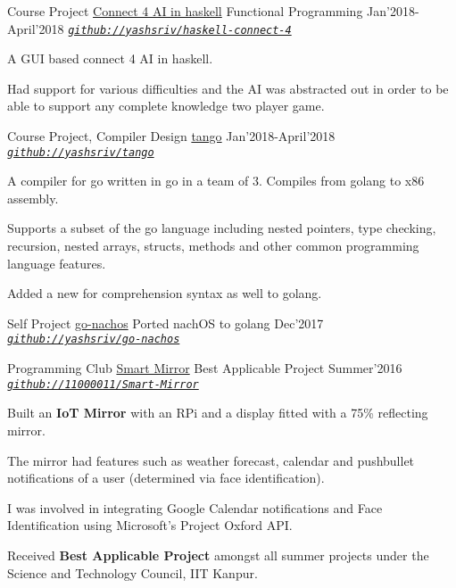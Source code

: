 \begin{cventries}
  \smallcventry
  {Course Project}
  {\href{https://github.com/yashsriv/haskell-connect-4}{Connect 4 AI in haskell}}
  {Functional Programming}
  {Jan'2018-April'2018}
  {\emph{\texttt{\href{https://github.com/yashsriv/haskell-connect-4}{github://yashsriv/haskell-connect-4}}}}
  {
    \begin{cvitems}
    \item A GUI based connect 4 AI in haskell.
    \item Had support for various difficulties and the AI was abstracted out in
      order to be able to support any complete knowledge two player game.
    \end{cvitems}
  }

  \smallcventry
  {Course Project, Compiler Design}
  {\href{https://github.com/yashsriv/tango}{tango}  }
  {}
  {Jan'2018-April'2018}
  {\emph{\texttt{\href{https://github.com/yashsriv/tango}{github://yashsriv/tango}}}}
  {
    \begin{cvitems}
    \item A compiler for go written in go in a team of 3. Compiles from golang
      to x86 assembly.
    \item Supports a subset of the go language including nested pointers, type
      checking, recursion, nested arrays, structs, methods and other common
      programming language features.
    \item Added a new for comprehension syntax as well to golang.
    \end{cvitems}
  }

  \smallcventry
  {Self Project}
  {\href{https://github.com/yashsriv/go-nachos}{go-nachos}}
  {Ported nachOS to golang}
  {Dec'2017}
  {\emph{\texttt{\href{https://github.com/yashsriv/go-nachos}{github://yashsriv/go-nachos}}}}
  {}

  \smallcventry
  {Programming Club}
  {\href{http://pclub.in/project/2016/07/06/smartmirror.html}{Smart Mirror}}
  {Best Applicable Project}
  {Summer'2016}
  {\emph{\texttt{\href{https://github.com/11000011/Smart-Mirror}{github://11000011/Smart-Mirror}}}}
  {
    \begin{cvitems}
    \item Built an \textbf{IoT Mirror} with an RPi and a display fitted with a 75\%
      reflecting mirror.
    \item The mirror had features such as weather forecast, calendar
      and pushbullet notifications of a user (determined via face
      identification).
      \item I was involved in integrating Google Calendar notifications and Face
        Identification using Microsoft’s Project Oxford API.
    \item Received \textbf{Best Applicable Project} amongst all summer projects under
      the Science and Technology Council, IIT Kanpur.
    \end{cvitems}
  }


\end{cventries}
